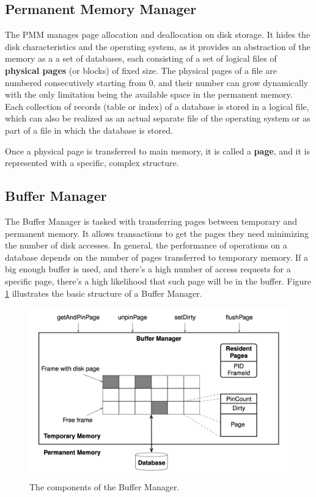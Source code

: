 \subsection{Permanent Memory Manager}

The PMM manages page allocation and deallocation on disk storage. It hides the disk characteristics and the operating system, as it provides an abstraction of the memory as a a set of databases, each consisting of a set of logical files of \textbf{physical pages} (or blocks) of fixed size. The physical pages of a file are numbered consecutively starting from 0, and their number can grow dynamically with the only limitation being the available space in the permanent memory. Each collection of records (table or index) of a database is stored in a logical file, which can also be realized as an actual separate file of the operating system or as part of a file in which the database is stored.

Once a physical page is transferred to main memory, it is called a \textbf{page}, and it is represented with a specific, complex structure.

\subsection{Buffer Manager}

The Buffer Manager is tasked with transferring pages between temporary and permanent memory. It allows transactions to get the pages they need minimizing the number of disk accesses. In general, the performance of operations on a database depends on the number of pages transferred to temporary memory. If a big enough buffer is used, and there's a high number of access requests for a specific page, there's a high likelihood that such page will be in the buffer. Figure \ref{fig:buffermanager} illustrates the basic structure of a Buffer Manager.

\begin{figure}[ht]
    \centering
    \includegraphics[width=0.5\linewidth]{img/Buffer Manager.png}
    \caption{The components of the Buffer Manager.}
    \label{fig:buffermanager}
\end{figure}

